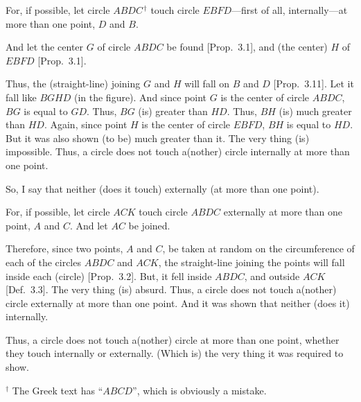 \begin{Parallel}{}{}
{\epsfysize=2.2in
\centerline{}

For, if possible, let circle $ABDC$$^{\,\dag}$ touch circle $EBFD$---first of all, internally---at more than one point, $D$ and $B$.

And let the center $G$ of circle $ABDC$ be found [Prop.~3.1], and
(the center) $H$ of $EBFD$ [Prop.~3.1].

Thus, the (straight-line) joining $G$ and $H$ will fall on $B$ and $D$ [Prop.~3.11].
Let it fall like $BGHD$ (in the figure). And since point $G$ is the center of
circle $ABDC$, $BG$ is  equal to $GD$. Thus, $BG$ (is) greater than $HD$.
Thus, $BH$ (is) much greater than $HD$. Again, since point $H$ is the
center of circle $EBFD$, $BH$ is equal to $HD$. But it was also shown
(to be) much greater than it. The very thing (is) impossible.
Thus, a circle does not touch a(nother) circle internally at more than one point.

So, I say that neither (does it touch) externally (at more than one point).

For, if possible, let circle $ACK$ touch circle $ABDC$ externally at more
than one point, $A$ and $C$. And let $AC$ be joined.

Therefore, since  two points, $A$ and $C$,
be taken at random on the circumference
of each of the circles $ABDC$ and $ACK$, the straight-line joining
the points will fall inside each (circle) [Prop.~3.2]. But, it fell
inside $ABDC$, and outside $ACK$ [Def.~3.3]. The very thing (is) absurd.
Thus, a circle does not touch a(nother) circle externally  at more than one
point. And it was shown that neither (does it) internally.

Thus, a circle does not touch a(nother) circle at more than one point, whether they touch internally or externally. (Which is) the very thing it was required to
show.}
\end{Parallel}
{\footnotesize \noindent$^\dag$ The Greek text has ``$ABCD$'', which is obviously a mistake.}

